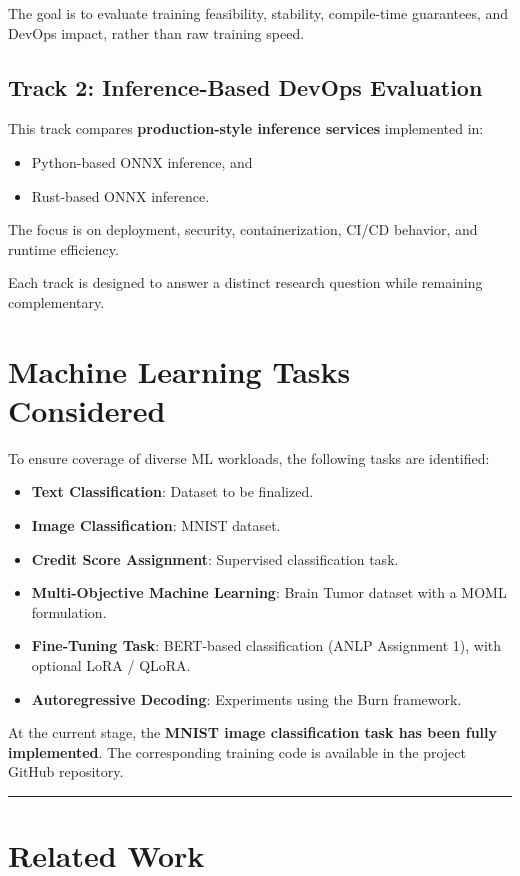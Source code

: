 \documentclass{ieeeaccess}
\begin{document}
The goal is to evaluate training feasibility, stability, compile-time guarantees, and DevOps impact, rather than raw training speed.

\subsection*{Track 2: Inference-Based DevOps Evaluation}
This track compares \textbf{production-style inference services} implemented in:
\begin{itemize}
    \item Python-based ONNX inference, and
    \item Rust-based ONNX inference.
\end{itemize}

The focus is on deployment, security, containerization, CI/CD behavior, and runtime efficiency. 

Each track is designed to answer a distinct research question while remaining complementary.

\section{Machine Learning Tasks Considered}

To ensure coverage of diverse ML workloads, the following tasks are identified:

\begin{itemize}
    \item \textbf{Text Classification}: Dataset to be finalized.
    \item \textbf{Image Classification}: MNIST dataset.
    \item \textbf{Credit Score Assignment}: Supervised classification task.
    \item \textbf{Multi-Objective Machine Learning}: Brain Tumor dataset with a MOML formulation.
    \item \textbf{Fine-Tuning Task}: BERT-based classification (ANLP Assignment 1), with optional LoRA / QLoRA.
    \item \textbf{Autoregressive Decoding}: Experiments using the Burn framework.
\end{itemize}

At the current stage, the \textbf{MNIST image classification task has been fully implemented}.  
The corresponding training code is available in the project GitHub repository.

\hrule

\section{Related Work}
\end{document}
